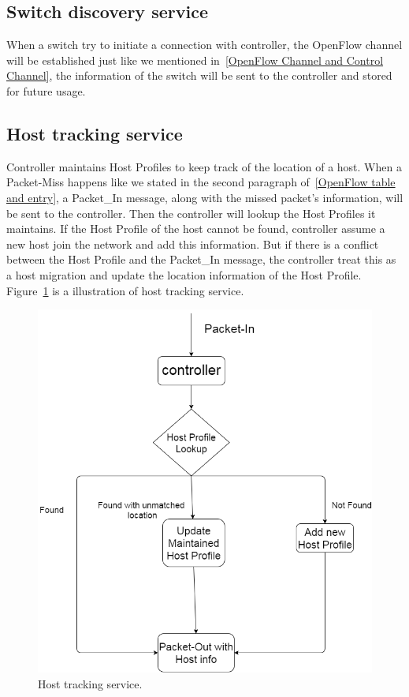 \subsection{Switch discovery service}
\label{Switch discovery service}
When a switch try to initiate a connection with controller, the OpenFlow channel will be established just like we mentioned in~\ref{OpenFlow Channel and Control Channel}, the information of the switch will be sent to the controller and stored for future usage. 

\subsection{Host tracking service}
\label{Host tracking service}
Controller maintains Host Profiles to keep track of the location of a host. When a Packet-Miss happens like we stated in the second paragraph of~\ref{OpenFlow table and entry}, a Packet\_In message, along with the missed packet's information, will be sent to the controller. Then the controller will lookup the Host Profiles it maintains. If the Host Profile of the host cannot be found, controller assume a new host join the network and add this information. But if there is a conflict between the Host Profile and the Packet\_In message, the controller treat this as a host migration and update the location information of the Host Profile. Figure~\ref{HTS} is a illustration of host tracking service.

\begin{figure}[H]
\begin{center} 
\includegraphics[width=1\textwidth]{figures/Host_tracking.png}
\end{center}
\caption{Host tracking service.}
\label{HTS}
\end{figure}

